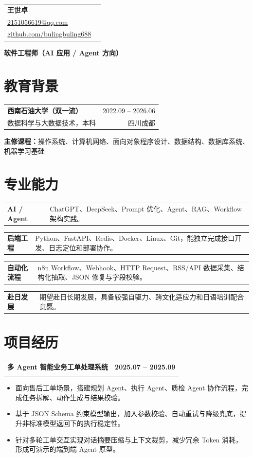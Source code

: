 \documentclass[10pt,a4paper]{article}
\makeatletter
\newcommand{\nameHeader}[1]{%
  {\fontsize{24pt}{27pt}\selectfont\bfseries\color{heading}#1}
}
\newcommand{\contactLine}[1]{%
  {\small\color{muted}#1}
}
\newcommand{\resumeSubheading}[4]{%
  \begin{tabularx}{\textwidth}{@{}X r@{}}
    \textbf{#1} & {\small #2} \\
    {\small\color{muted}#3} & {\small\color{muted}#4}
  \end{tabularx}
  \vspace{-1pt}
}
\newcommand{\projectHeading}[3]{%
  \vspace{1pt}
  \begin{tabularx}{\textwidth}{@{}>{\raggedright\arraybackslash}X r@{}}
    \textbf{#1} & {\small\bfseries #3} \\
    {\small\color{muted}#2} &
  \end{tabularx}
  \vspace{-3pt}
}
\newcommand{\skill}[2]{%
  \noindent\begin{tabularx}{\textwidth}{@{}>{\bfseries\color{heading}}p{2.45cm}X@{}}
    #1 & {\small #2}
  \end{tabularx}\par
  \vspace{1.5pt}
}
\newcommand{\tag}[1]{%
  \colorbox{accentLight}{\strut\hspace{3pt}{\small\textcolor{accent}{#1}}\hspace{3pt}}
}
\makeatother
\begin{document}
\ifPDFTeX
\begin{CJK*}{UTF8}{gbsn}
\fi

\begin{tabularx}{\textwidth}{@{}X r@{}}
  \nameHeader{王世卓} &
  \begin{tabular}{r@{}}
    \contactLine{18837502016} \\
    \contactLine{\href{mailto:2151056619@qq.com}{2151056619@qq.com}} \\
    \contactLine{\href{https://github.com/bulingbuling688}{github.com/bulingbuling688}}
  \end{tabular}
\end{tabularx}
\vspace{3pt}

{\large\bfseries\color{accent} 软件工程师（AI 应用 / Agent 方向）}\par
\vspace{4pt}
{\tag{Agent} \quad \tag{RAG} \quad \tag{Workflow} \quad \tag{FastAPI} \quad \tag{n8n} \quad \tag{Docker}}
\vspace{3pt}

\section{教育背景}
\resumeSubheading
  {西南石油大学（双一流）}
  {2022.09 -- 2026.06}
  {数据科学与大数据技术，本科}
  {四川成都}
{\small\textbf{主修课程：}操作系统、计算机网络、面向对象程序设计、数据结构、数据库系统、机器学习基础}

\section{专业能力}
\skill{AI / Agent}{ChatGPT、DeepSeek、Prompt 优化、Agent、RAG、Workflow 架构实践。}
\skill{后端工程}{Python、FastAPI、Redis、Docker、Linux、Git，能独立完成接口开发、日志定位和部署协作。}
\skill{自动化流程}{n8n Workflow、Webhook、HTTP Request、RSS/API 数据采集、结构化抽取、JSON 修复与字段校验。}
\skill{赴日发展}{期望赴日长期发展，具备较强自驱力、跨文化适应力和日语培训配合意愿。}

\section{项目经历}
\projectHeading
  {多 Agent 智能业务工单处理系统}
  {Python / LangChain / FastAPI / JSON Schema}
  {2025.07 -- 2025.09}
\begin{itemize}
  \item 面向售后工单场景，搭建规划 Agent、执行 Agent、质检 Agent 协作流程，完成任务拆解、动作生成与结果校验。
  \item 基于 JSON Schema 约束模型输出，加入参数校验、自动重试与降级兜底，提升非标准模型返回下的执行稳定性。
  \item 针对多轮工单交互实现对话摘要压缩与上下文裁剪，减少冗余 Token 消耗，形成可演示的端到端 Agent 原型。
\end{itemize}


\end{CJK*}
\end{document}
